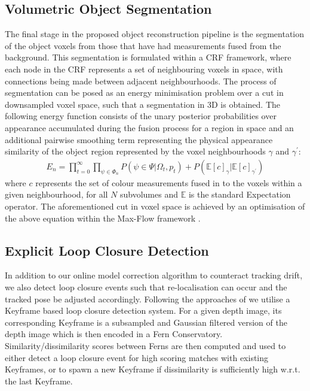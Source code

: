 \subsection{Volumetric Object Segmentation}
\label{subsec:shapeoptimisation}
The final stage in the proposed object reconstruction pipeline is the segmentation of the object voxels from those that have had measurements fused 
from the background. This segmentation is formulated within a CRF framework, where each node in the CRF represents a set of neighbouring voxels in space, 
with connections being made between adjacent neighbourhoods. The process of segmentation can be posed as an energy minimisation problem over a cut in downsampled voxel space, 
such that a segmentation in 3D is obtained. The following energy function consists of the unary posterior probabilities over appearance accumulated during the fusion 
process for a region in space and an additional pairwise smoothing term representing the physical appearance similarity of the object region represented by the voxel 
neighbourhoods $\gamma$ and $\gamma^{'}$:
\begin{equation}
\begin{split}
E_{n} = \prod_{t=0}^{\infty} \prod_{\psi \in \Phi_{n}} P(\psi \in \Psi | \Omega_{t}, p_{t}) + P(\mathbb{E}[c]_{\gamma} | \mathbb{E}[c]_{\gamma^{'}})
\end{split}
\end{equation}
where $c$ represents the set of colour measurements fused in to the voxels within a given neighbourhood, for all $N$ subvolumes and $\mathbb{E}$ is the standard Expectation operator.
The aforementioned cut in voxel space is achieved by an optimisation of the above equation within the Max-Flow framework \cite{BoykovKolmogorov}. 

\subsection{Explicit Loop Closure Detection}
In addition to our online model correction algorithm to counteract tracking drift, we also detect loop closure events such that re-localisation can occur and 
the tracked pose be adjusted accordingly. Following the approaches of \cite{Glocker15,Kahler2016} we utilise a Keyframe based loop closure detection system. For a 
given depth image, its corresponding Keyframe is a subsampled and Gaussian filtered version of the depth image which is then encoded in a Fern Conservatory. 
Similarity/dissimilarity scores between Ferns are then computed and used to either detect a loop closure event for high scoring matches with existing Keyframes, 
or to spawn a new Keyframe if dissimilarity is sufficiently high w.r.t. the last Keyframe.

